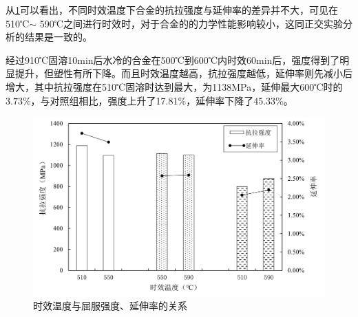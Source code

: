从\ref{fig:sqy}可以看出，不同时效温度下合金的抗拉强度与延伸率的差异并不大，可见在510℃$\sim$ 590℃之间进行时效时，对于合金的的力学性能影响较小，这同正交实验分析的结果是一致的。

经过910℃固溶10min后水冷的合金在500℃到600℃内时效60min后，强度得到了明显提升，但塑性有所下降。而且时效温度越高，抗拉强度越低，延伸率则先减小后增大，其中抗拉强度在510℃固溶时达到最大，为1138MPa，延伸最大600℃时的$ 3.73\% $，与对照组相比，强度上升了17.81$ \% $，延伸率下降了$ 45.33\% $。
\begin{figure}[h!]
	\centering
	\includegraphics[width=0.7\linewidth]{pic/时效温度与屈服强度、延伸率的关系}
	\caption{时效温度与屈服强度、延伸率的关系}
	\label{fig:sqy}
\end{figure}


